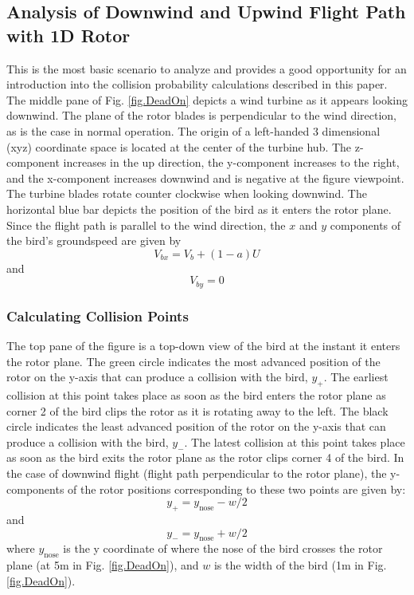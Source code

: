 \documentclass[10pt,conference]{IEEEtran}
\begin{document}
\subsection{Analysis of Downwind and Upwind Flight Path with 1D Rotor}
This is the most basic scenario to analyze and provides a good opportunity for an introduction into the collision
probability calculations described in this paper. The middle pane of Fig. \ref{fig.DeadOn} depicts a wind turbine as it
appears looking downwind. The plane of the rotor blades is perpendicular to the wind direction, as is the case in
normal operation. The origin of a left-handed 3 dimensional (xyz) coordinate space is located at the center of the
turbine hub. The z-component increases in the up direction, the y-component increases to the right, and the x-component
increases downwind and is negative at the figure viewpoint. The turbine blades rotate counter clockwise when looking
downwind. The horizontal blue bar depicts the position of the bird as it enters the rotor plane. Since the flight path
is parallel to the wind direction, the $x$ and $y$ components of the bird's groundspeed are given by
\begin{equation*}
    V_{bx} = V_b +(1-a)U
\end{equation*}
and
\begin{equation*}
    V_{by} = 0
\end{equation*}


\subsubsection{Calculating Collision Points}
The top pane of the figure is a top-down view of the bird at the instant it enters the rotor plane. The green circle
indicates the most advanced position of the rotor on the y-axis that can produce a collision with the bird, $y_+$. The
earliest collision at this point takes place as soon as the bird enters the rotor plane as corner 2 of the bird clips
the rotor as it is rotating away to the left. The black circle indicates the least advanced position of the rotor on
the y-axis that can produce a collision with the bird, $y_-$. The latest collision at this point takes place as soon as
the bird exits the rotor plane as the rotor clips corner 4 of the bird. In the case of downwind flight (flight path
perpendicular to the rotor plane), the y-components of the rotor positions corresponding to these two points are given
by:
\begin{equation*}\label{DeadOnLeft}
    y_{+} = y_{\text{nose}} - w/2
\end{equation*}
and
\begin{equation*}\label{DeadOnRight}
    y_{-} = y_{\text{nose}} + w/2
\end{equation*}
where $y_{\text{nose}}$ is the y coordinate of where the nose of the bird crosses the rotor plane (at 5m in Fig.
\ref{fig.DeadOn}), and $w$ is the width of the bird (1m in Fig. \ref{fig.DeadOn}).
\end{document}
